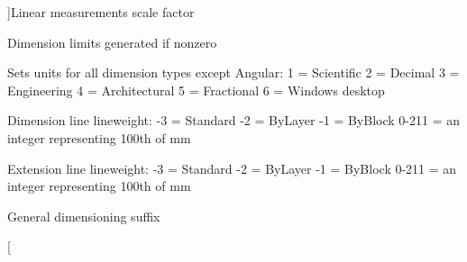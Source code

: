 \begin{Desc}
\begin{description}
{}]Linear measurements scale factor \item[{\em 
D\+I\+M\+L\+IM\hypertarget{class_c_a_d_header_abd894aab7aa85b4c4634e67fb93d6886a1476f0e0fb38b9c70dce9eb0c674d58d}{}\label{class_c_a_d_header_abd894aab7aa85b4c4634e67fb93d6886a1476f0e0fb38b9c70dce9eb0c674d58d}
}]Dimension limits generated if nonzero \item[{\em 
D\+I\+M\+L\+U\+N\+IT\hypertarget{class_c_a_d_header_abd894aab7aa85b4c4634e67fb93d6886a8d8347db70dc7f66335dc27c83feda3b}{}\label{class_c_a_d_header_abd894aab7aa85b4c4634e67fb93d6886a8d8347db70dc7f66335dc27c83feda3b}
}]Sets units for all dimension types except Angular\+: 1 = Scientific 2 = Decimal 3 = Engineering 4 = Architectural 5 = Fractional 6 = Windows desktop \item[{\em 
D\+I\+M\+L\+WD\hypertarget{class_c_a_d_header_abd894aab7aa85b4c4634e67fb93d6886aeacf8893f9ce9bf285aa555ee7494d04}{}\label{class_c_a_d_header_abd894aab7aa85b4c4634e67fb93d6886aeacf8893f9ce9bf285aa555ee7494d04}
}]Dimension line lineweight\+: -\/3 = Standard -\/2 = By\+Layer -\/1 = By\+Block 0-\/211 = an integer representing 100th of mm \item[{\em 
D\+I\+M\+L\+WE\hypertarget{class_c_a_d_header_abd894aab7aa85b4c4634e67fb93d6886a4ee6a6cd95762d0398172a18fc4cdc5d}{}\label{class_c_a_d_header_abd894aab7aa85b4c4634e67fb93d6886a4ee6a6cd95762d0398172a18fc4cdc5d}
}]Extension line lineweight\+: -\/3 = Standard -\/2 = By\+Layer -\/1 = By\+Block 0-\/211 = an integer representing 100th of mm \item[{\em 
D\+I\+M\+P\+O\+ST\hypertarget{class_c_a_d_header_abd894aab7aa85b4c4634e67fb93d6886afbd978578868969456b557466588a629}{}\label{class_c_a_d_header_abd894aab7aa85b4c4634e67fb93d6886afbd978578868969456b557466588a629}
}]General dimensioning suffix \item[{\em 
}
\end{description}
\end{Desc}
